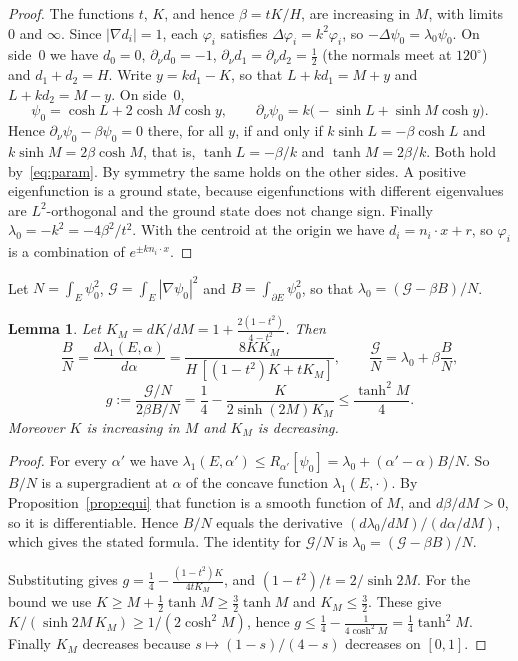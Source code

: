 \documentclass[11pt]{article}
\newtheorem{lemma}[theorem]{Lemma}
\theoremstyle{remark}
\newcommand{\E}{E}
\begin{document}
\begin{proof}
The functions $t$, $K$, and hence $\beta=tK/H$, are increasing in $M$, with limits $0$ and $\infty$. Since
$|\nabla d_i|=1$, each $\varphi_i$ satisfies $\Delta\varphi_i=k^2\varphi_i$, so $-\Delta\psi_0=\lambda_0\psi_0$.
On side~$0$ we have $d_0=0$, $\partial_\nu d_0=-1$, $\partial_\nu d_1=\partial_\nu d_2=\frac12$ (the
normals meet at $120^\circ$) and $d_1+d_2=H$. Write $y=kd_1-K$, so that $L+kd_1=M+y$ and $L+kd_2=M-y$.
On side~$0$,
\[
  \psi_0=\cosh L+2\cosh M\cosh y,\qquad
  \partial_\nu\psi_0=k\bigl(-\sinh L+\sinh M\cosh y\bigr).
\]
Hence $\partial_\nu\psi_0-\beta\psi_0=0$ there, for all $y$, if and only if $k\sinh L=-\beta\cosh L$ and
$k\sinh M=2\beta\cosh M$, that is, $\tanh L=-\beta/k$ and $\tanh M=2\beta/k$. Both hold
by~\eqref{eq:param}. By symmetry the same holds on the other sides. A positive eigenfunction is a ground
state, because eigenfunctions with different eigenvalues are $L^2$-orthogonal and the ground state does
not change sign. Finally $\lambda_0=-k^2=-4\beta^2/t^2$. With the centroid at the origin we have
$d_i=n_i\cdot x+r$, so $\varphi_i$ is a combination of $e^{\pm kn_i\cdot x}$.
\end{proof}

Let $N=\int_\E\psi_0^2$, $\mathcal G=\int_\E|\nabla\psi_0|^2$ and $B=\int_{\partial\E}\psi_0^2$, so that
$\lambda_0=(\mathcal G-\beta B)/N$.

\begin{lemma}\label{lem:HF}
Let $K_M=dK/dM=1+\frac{2(1-t^2)}{4-t^2}$. Then
\[
  \frac BN=\frac{d\lambda_1(\E,\alpha)}{d\alpha}=\frac{8KK_M}{H\,[(1-t^2)K+tK_M]},\qquad
  \frac{\mathcal G}N=\lambda_0+\beta\frac BN,
\]
\[
  g:=\frac{\mathcal G/N}{2\beta B/N}=\frac14-\frac{K}{2\sinh(2M)K_M}\le\frac{\tanh^2M}{4}.
\]
Moreover $K$ is increasing in $M$ and $K_M$ is decreasing.
\end{lemma}

\begin{proof}
For every $\alpha'$ we have $\lambda_1(\E,\alpha')\le R_{\alpha'}[\psi_0]=\lambda_0+(\alpha'-\alpha)B/N$.
So $B/N$ is a supergradient at $\alpha$ of the concave function $\lambda_1(\E,\cdot)$. By
Proposition~\ref{prop:equi} that function is a smooth function of $M$, and $d\beta/dM>0$, so it is
differentiable. Hence $B/N$ equals the derivative $(d\lambda_0/dM)/(d\alpha/dM)$, which gives the stated
formula. The identity for $\mathcal G/N$ is $\lambda_0=(\mathcal G-\beta B)/N$.

Substituting gives $g=\frac14-\frac{(1-t^2)K}{4tK_M}$, and $(1-t^2)/t=2/\sinh 2M$. For the bound we use
$K\ge M+\frac12\tanh M\ge\frac32\tanh M$ and $K_M\le\frac32$. These give
$K/(\sinh 2M\,K_M)\ge1/(2\cosh^2M)$, hence $g\le\frac14-\frac1{4\cosh^2M}=\frac14\tanh^2M$. Finally $K_M$
decreases because $s\mapsto(1-s)/(4-s)$ decreases on $[0,1]$.
\end{proof}
\end{document}
